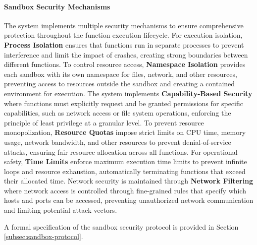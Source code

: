 \documentclass[12pt,a4paper]{article}
\begin{document}
\paragraph{Sandbox Security Mechanisms}
The system implements multiple security mechanisms to ensure comprehensive protection throughout the function execution lifecycle. For execution isolation, \textbf{Process Isolation} ensures that functions run in separate processes to prevent interference and limit the impact of crashes, creating strong boundaries between different functions. To control resource access, \textbf{Namespace Isolation} provides each sandbox with its own namespace for files, network, and other resources, preventing access to resources outside the sandbox and creating a contained environment for execution. The system implements \textbf{Capability-Based Security} where functions must explicitly request and be granted permissions for specific capabilities, such as network access or file system operations, enforcing the principle of least privilege at a granular level. To prevent resource monopolization, \textbf{Resource Quotas} impose strict limits on CPU time, memory usage, network bandwidth, and other resources to prevent denial-of-service attacks, ensuring fair resource allocation across all functions. For operational safety, \textbf{Time Limits} enforce maximum execution time limits to prevent infinite loops and resource exhaustion, automatically terminating functions that exceed their allocated time. Network security is maintained through \textbf{Network Filtering} where network access is controlled through fine-grained rules that specify which hosts and ports can be accessed, preventing unauthorized network communication and limiting potential attack vectors.

A formal specification of the sandbox security protocol is provided in Section \ref{subsec:sandbox-protocol}.


\end{document}
